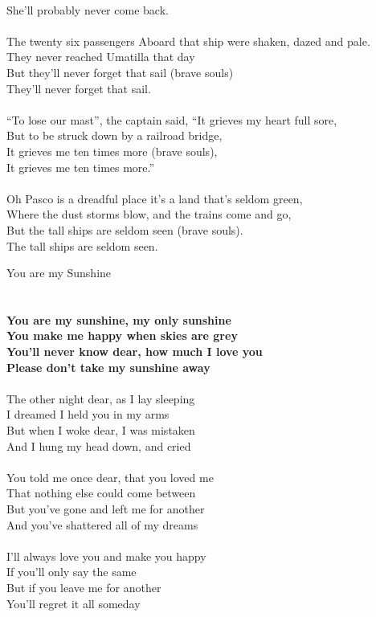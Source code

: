 \documentclass[letterpaper,9pt]{article}
\begin{document}
\\She'll probably never come back.
\\
\\The twenty six passengers Aboard that ship were shaken, dazed and pale.
\\They never reached Umatilla that day
\\But they'll never forget that sail (brave souls)
\\They'll never forget that sail.
\\
\\“To lose our mast”, the captain said, “It grieves my heart full sore,
\\But to be struck down by a railroad bridge,
\\It grieves me ten times more (brave souls),
\\It grieves me ten times more.”
\\
\\Oh Pasco is a dreadful place it's a land that's seldom green,
\\Where the dust storms blow, and the trains come and go,
\\But the tall ships are seldom seen (brave souls).
\\The tall ships are seldom seen.

\newpage
{}
\huge
You are my Sunshine\\
\\
\huge
\\\textbf{You are my sunshine, my only sunshine
\\You make me happy when skies are grey
\\You'll never know dear, how much I love you
\\Please don't take my sunshine away}
\\
\\The other night dear, as  I lay sleeping
\\I dreamed I held you in my arms
\\But when I woke dear, I was mistaken
\\And I hung my head down, and cried
\\
\\You told me once dear, that you loved me
\\That nothing else could come between
\\But you've gone and left me for another
\\And you've shattered all of my dreams
\\
\\I'll always love you and make you happy 
\\If you'll only say the same
\\But if you leave me for another
\\You'll regret it all someday
\end{document}
